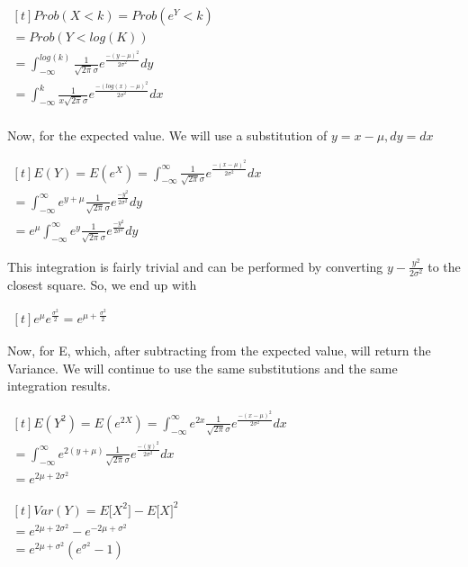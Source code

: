 \documentclass[]{article}
\begin{document}
\begin{center}
 $
    \begin{aligned}[t]
	Prob(X<k)=Prob(e^Y<k)\\
=Prob(Y<log(K))\\
= \int_{-\infty}^{log(k)} \frac{1}{\sqrt{2\pi}\sigma}e^\frac{-(y-\mu)^2}{2\sigma^2} dy\\
= \int_{-\infty}^{k} \frac{1}{x\sqrt{2\pi}\sigma}e^\frac{-(log(x)-\mu)^2}{2\sigma^2} dx\\
\end{aligned}
$
\end{center}
Now, for the expected value. We will use a substitution of $y=x-\mu,dy=dx$
\begin{center}
 $
    \begin{aligned}[t]
	E(Y)=E(e^X)= \int_{-\infty}^{\infty} \frac{1}{\sqrt{2\pi}\sigma}e^\frac{-(x-\mu)^2}{2\sigma^2} dx\\
	=\int_{-\infty}^{\infty}e^{y+\mu} \frac{1}{\sqrt{2\pi}\sigma}e^\frac{-y^2}{2\sigma^2} dy\\
	={e^\mu}\int_{-\infty}^{\infty}e^{y} \frac{1}{\sqrt{2\pi}\sigma}e^\frac{-y^2}{2\sigma^2} dy
\end{aligned}
$

\end{center}
This integration is fairly trivial and can be performed by converting $y-\frac{y^2}{2\sigma^2}$ to the closest square.
So, we end up with
\begin{center}
 $
    \begin{aligned}[t]
	{e^\mu}{e^\frac{\sigma^2}{2}}=e^{\mu+\frac{\sigma^2}{2}}
\end{aligned}
$
\end{center}
Now, for E\big[$X^2$\big], which, after subtracting from the expected value, will return the Variance. We will continue to use the same substitutions and the same integration results.
\begin{center}
 $
    \begin{aligned}[t]
	E(Y^2)=E(e^{2X})=\int_{-\infty}^{\infty}e^{2x} \frac{1}{\sqrt{2\pi}\sigma}e^\frac{-(x-\mu)^2}{2\sigma^2} dx\\
	=\int_{-\infty}^{\infty}e^{2(y+\mu)} \frac{1}{\sqrt{2\pi}\sigma}e^\frac{-(y)^2}{2\sigma^2} dx\\
	=e^{2\mu+2\sigma^2}
\end{aligned}
$
\end{center}
\begin{center}
 $
    \begin{aligned}[t]
	Var(Y)=E\big[X^2\big]-E\big[X\big]^2\\
	=e^{2\mu + 2\sigma^2}-e^{-2\mu+\sigma^2}\\
	=e^{2\mu + \sigma^2}(e^{\sigma^2}-1)
\end{aligned}
$
\end{center}
\end{document}
